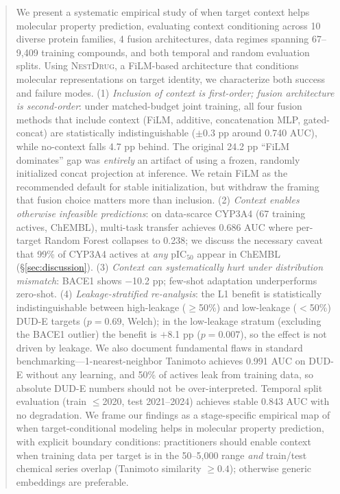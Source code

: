 \documentclass[sigconf]{acmart}
\newcommand{\methodname}{\textsc{NestDrug}}
\begin{document}
\begin{abstract}
We present a systematic empirical study of when target context helps molecular property prediction, evaluating context conditioning across 10 diverse protein families, 4 fusion architectures, data regimes spanning 67--9{,}409 training compounds, and both temporal and random evaluation splits. Using \methodname{}, a FiLM-based architecture that conditions molecular representations on target identity, we characterize both success and failure modes. (1) \textit{Inclusion of context is first-order; fusion architecture is second-order}: under matched-budget joint training, all four fusion methods that include context (FiLM, additive, concatenation MLP, gated-concat) are statistically indistinguishable ($\pm 0.3$ pp around 0.740 AUC), while no-context falls 4.7 pp behind. The original 24.2 pp ``FiLM dominates'' gap was \emph{entirely} an artifact of using a frozen, randomly initialized concat projection at inference. We retain FiLM as the recommended default for stable initialization, but withdraw the framing that fusion choice matters more than inclusion. (2) \textit{Context enables otherwise infeasible predictions}: on data-scarce CYP3A4 (67 training actives, ChEMBL), multi-task transfer achieves 0.686 AUC where per-target Random Forest collapses to 0.238; we discuss the necessary caveat that 99\% of CYP3A4 actives at \emph{any} pIC$_{50}$ appear in ChEMBL (\S\ref{sec:discussion}). (3) \textit{Context can systematically hurt under distribution mismatch}: BACE1 shows $-$10.2 pp; few-shot adaptation underperforms zero-shot. (4) \textit{Leakage-stratified re-analysis}: the L1 benefit is statistically indistinguishable between high-leakage ($\geq$50\%) and low-leakage ($<$50\%) DUD-E targets ($p = 0.69$, Welch); in the low-leakage stratum (excluding the BACE1 outlier) the benefit is $+$8.1 pp ($p = 0.007$), so the effect is not driven by leakage. We also document fundamental flaws in standard benchmarking---1-nearest-neighbor Tanimoto achieves 0.991 AUC on DUD-E without any learning, and 50\% of actives leak from training data, so absolute DUD-E numbers should not be over-interpreted. Temporal split evaluation (train $\leq$2020, test 2021--2024) achieves stable 0.843 AUC with no degradation. We frame our findings as a stage-specific empirical map of when target-conditional modeling helps in molecular property prediction, with explicit boundary conditions: practitioners should enable context when training data per target is in the 50--5{,}000 range \emph{and} train/test chemical series overlap (Tanimoto similarity $\geq 0.4$); otherwise generic embeddings are preferable.
\end{abstract}
\end{document}
